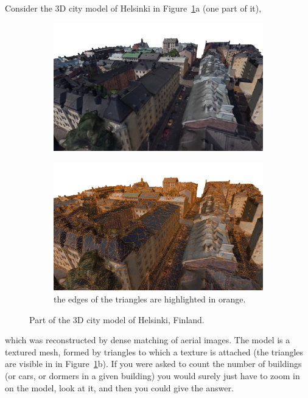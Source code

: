 Consider the 3D city model of Helsinki in Figure~\ref{fig:mesh}a (one part of it),
\begin{figure}
  \centering
  \begin{subfigure}[b]{0.48\linewidth}
    \centering
    \includegraphics[width=\textwidth]{figs/mesh01.png}
    \caption{}
  \end{subfigure}
  \begin{subfigure}[b]{0.48\linewidth}
    \centering
    \includegraphics[width=\textwidth]{figs/mesh04.png}
    \caption{the edges of the triangles are highlighted in orange.}
  \end{subfigure}
\caption{Part of the 3D city model of Helsinki, Finland.}%
\label{fig:mesh}
\end{figure}
which was reconstructed by dense matching of aerial images.
The model is a textured mesh, formed by triangles to which a texture is attached (the triangles are visible in in Figure~\ref{fig:mesh}b).
If you were asked to count the number of buildings (or cars, or dormers in a given building) you would surely just have to zoom in on the model, look at it, and then you could give the answer.
